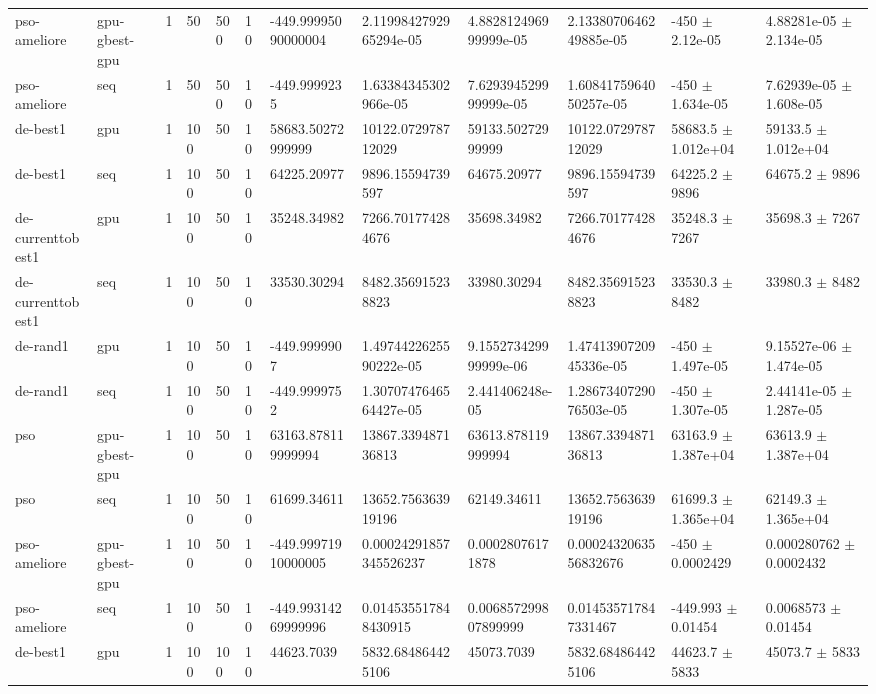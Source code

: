 \begin{table}[t]
\begin{tabular}{llllllllllll}
pso-ameliore & gpu-gbest-gpu & 1 & 50 & 500 & 10 & -449.99995090000004 & 2.1199842792965294e-05 & 4.882812496999999e-05 & 2.1338070646249885e-05 & -450 $\pm$ 2.12e-05 & 4.88281e-05 $\pm$ 2.134e-05 \\
pso-ameliore & seq & 1 & 50 & 500 & 10 & -449.9999235 & 1.63384345302966e-05 & 7.629394529999999e-05 & 1.6084175964050257e-05 & -450 $\pm$ 1.634e-05 & 7.62939e-05 $\pm$ 1.608e-05 \\
de-best1 & gpu & 1 & 100 & 50 & 10 & 58683.50272999999 & 10122.072978712029 & 59133.50272999999 & 10122.072978712029 & 58683.5 $\pm$ 1.012e+04 & 59133.5 $\pm$ 1.012e+04 \\
de-best1 & seq & 1 & 100 & 50 & 10 & 64225.20977 & 9896.15594739597 & 64675.20977 & 9896.15594739597 & 64225.2 $\pm$ 9896 & 64675.2 $\pm$ 9896 \\
de-currenttobest1 & gpu & 1 & 100 & 50 & 10 & 35248.34982 & 7266.701774284676 & 35698.34982 & 7266.701774284676 & 35248.3 $\pm$ 7267 & 35698.3 $\pm$ 7267 \\
de-currenttobest1 & seq & 1 & 100 & 50 & 10 & 33530.30294 & 8482.356915238823 & 33980.30294 & 8482.356915238823 & 33530.3 $\pm$ 8482 & 33980.3 $\pm$ 8482 \\
de-rand1 & gpu & 1 & 100 & 50 & 10 & -449.9999907 & 1.4974422625590222e-05 & 9.155273429999999e-06 & 1.4741390720945336e-05 & -450 $\pm$ 1.497e-05 & 9.15527e-06 $\pm$ 1.474e-05 \\
de-rand1 & seq & 1 & 100 & 50 & 10 & -449.9999752 & 1.3070747646564427e-05 & 2.441406248e-05 & 1.2867340729076503e-05 & -450 $\pm$ 1.307e-05 & 2.44141e-05 $\pm$ 1.287e-05 \\
pso & gpu-gbest-gpu & 1 & 100 & 50 & 10 & 63163.878119999994 & 13867.339487136813 & 63613.878119999994 & 13867.339487136813 & 63163.9 $\pm$ 1.387e+04 & 63613.9 $\pm$ 1.387e+04 \\
pso & seq & 1 & 100 & 50 & 10 & 61699.34611 & 13652.756363919196 & 62149.34611 & 13652.756363919196 & 61699.3 $\pm$ 1.365e+04 & 62149.3 $\pm$ 1.365e+04 \\
pso-ameliore & gpu-gbest-gpu & 1 & 100 & 50 & 10 & -449.99971910000005 & 0.00024291857345526237 & 0.00028076171878 & 0.0002432063556832676 & -450 $\pm$ 0.0002429 & 0.000280762 $\pm$ 0.0002432 \\
pso-ameliore & seq & 1 & 100 & 50 & 10 & -449.99314269999996 & 0.014535517848430915 & 0.006857299807899999 & 0.014535717847331467 & -449.993 $\pm$ 0.01454 & 0.0068573 $\pm$ 0.01454 \\
de-best1 & gpu & 1 & 100 & 100 & 10 & 44623.7039 & 5832.684864425106 & 45073.7039 & 5832.684864425106 & 44623.7 $\pm$ 5833 & 45073.7 $\pm$ 5833 \\

\end{tabular}
\end{table}
